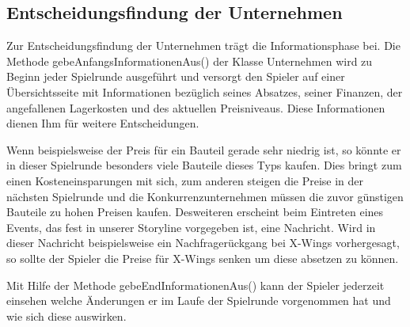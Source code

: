 \subsection{Entscheidungsfindung der Unternehmen}
\label{sub:fachkonzept-implementierung-entscheidungsfindung}


Zur Entscheidungsfindung der Unternehmen trägt die Informationsphase bei. Die Methode gebeAnfangsInformationenAus()
der Klasse Unternehmen wird zu Beginn jeder Spielrunde ausgeführt und versorgt den Spieler auf einer Übersichtsseite
mit Informationen bezüglich seines Absatzes, seiner Finanzen, der angefallenen Lagerkosten und des aktuellen Preisniveaus.
Diese Informationen dienen Ihm für weitere Entscheidungen.

Wenn beispielsweise der Preis für ein Bauteil gerade sehr niedrig ist, so könnte er in dieser Spielrunde besonders viele
Bauteile dieses Typs kaufen. Dies bringt zum einen Kosteneinsparungen mit sich, zum anderen steigen die Preise in der nächsten
Spielrunde und die Konkurrenzunternehmen müssen die zuvor günstigen Bauteile zu hohen Preisen kaufen. Desweiteren erscheint
beim Eintreten eines Events, das fest in unserer Storyline vorgegeben ist, eine Nachricht. Wird in dieser Nachricht
beispielsweise ein Nachfragerückgang bei X-Wings vorhergesagt, so sollte der Spieler die Preise für X-Wings senken
um diese absetzen zu können.

Mit Hilfe der Methode gebeEndInformationenAus() kann der Spieler jederzeit einsehen welche Änderungen er im Laufe der
Spielrunde vorgenommen hat und wie sich diese auswirken.